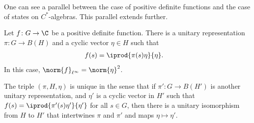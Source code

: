 \documentclass[10pt]{mypackage}
\begin{document}
One can see a parallel between the case of positive definite functions and the case of states on $C^{\ast}$-algebras. This parallel extends further.
\begin{theorem}
  Let $f\colon G\rightarrow \C$ be a positive definite function. There is a unitary representation $\pi\colon G\rightarrow B\left( H \right)$ and a cyclic vector $\eta\in H$ such that
  \begin{align*}
    f(s) &= \iprod{\pi(s)\eta}{\eta}.
  \end{align*}
  In this case, $\norm{f}_{\ell^{\infty}} = \norm{\eta}^2$.

  The triple $\left( \pi,H,\eta \right)$ is unique in the sense that if $\pi'\colon G\rightarrow B\left( H' \right)$ is another unitary representation, and $\eta'$ is a cyclic vector in $H'$ such that $f(s) = \iprod{\pi'(s)\eta'}{\eta'}$ for all $s\in G$, then there is a unitary isomorphism from $H$ to $H'$ that intertwines $\pi$ and $\pi'$ and maps $\eta\mapsto \eta'$.
\end{theorem}
\end{document}
